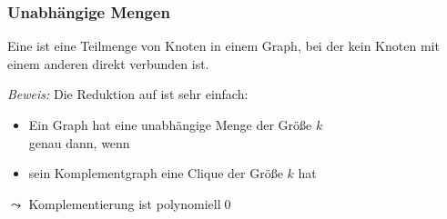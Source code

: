 \documentclass[aspectratio=1610,onlymath]{beamer}
\begin{document}
\begin{frame}\frametitle{Unabhängige Mengen}

Eine  ist eine Teilmenge von Knoten in einem Graph, bei der kein
Knoten mit einem anderen direkt verbunden ist.\medskip

\medskip\pause

\pause

\emph{Beweis:} Die Reduktion auf  ist sehr einfach:
\begin{itemize}
\item Ein Graph hat eine unabhängige Menge der Größe $k$\\
genau dann, wenn
\item sein Komplementgraph eine Clique der Größe $k$ hat
\end{itemize}
$\leadsto$ Komplementierung ist polynomiell\qed

\end{frame}
\end{document}
